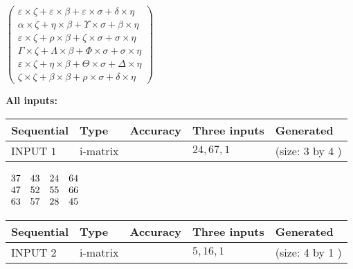 \documentclass[12pt]{article}
\begin{document}
   
 $  \left( \begin{array}
 {
 c
 }
  \varepsilon \times                     \zeta +  \varepsilon \times  \beta +  \varepsilon \times  \sigma +  \delta \times  \eta \\ 
  \alpha \times                     \zeta +  \eta \times  \beta +  \Upsilon \times  \sigma +  \beta \times  \eta \\ 
  \varepsilon \times                     \zeta +  \rho \times  \beta +                     \zeta \times  \sigma +  \sigma \times  \eta \\ 
  \Gamma \times                     \zeta +  \Lambda \times  \beta +  \Phi \times  \sigma +  \sigma \times  \eta \\ 
  \varepsilon \times                     \zeta +  \eta \times  \beta +  \Theta \times  \sigma +  \Delta \times  \eta \\ 
                     \zeta \times                     \zeta +  \beta \times  \beta +  \rho \times  \sigma +  \delta \times  \eta
 \end{array} \right) $ 
   
   
\noindent\vspace{0.1in}\hspace{-0.08in} {\textbf{\Large{All inputs: }}}
   
   
  
  
\noindent\begin{tabular}{|l|l|l|l|l|}
\hline
 Sequential & Type & Accuracy & Three inputs & Generated \\ 
\hline
 
 
  INPUT $            1 $ & i-matrix &  & $
 24
 , 
 67
 , 
 1
 $ & (size:            3  by            4 )
 \\  \hline  
 \end{tabular}
   
   
 $\begin{array}{
 c
 c
 c
 c
 }
          37  & 
          43  & 
          24  & 
          64  \\ 
          47  & 
          52  & 
          55  & 
          66  \\ 
          63  & 
          57  & 
          28  & 
          45
\end{array}  $ 
  
  
\noindent\begin{tabular}{|l|l|l|l|l|}
\hline
 Sequential & Type & Accuracy & Three inputs & Generated \\ 
\hline
 
 
  INPUT $            2 $ & i-matrix &  & $
 5
 , 
 16
 , 
 1
 $ & (size:            4  by            1 )
 \\  \hline  
 \end{tabular}
   
\end{document}
